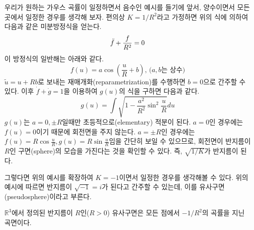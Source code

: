 \documentclass[10pt,a4paper]{article}
\begin{document}
우리가 원하는 가우스 곡률이 일정하면서 음수인 예시를 들기에 앞서, 양수이면서 모든 곳에서 일정한 경우를 생각해 보자. 편의상 $K = 1/R^{2}$라고 가정하면 위의 식에 의하여 다음과 같은 미분방정식을 얻는다.
\[\Ddot{f}+\frac{f}{R^2}=0\]
이 방정식의 일반해는 아래와 같다.
\[f(u) = a \cos \left( \frac{u}{R} + b \right)\text{, (}a, b\text{는 상수)}\]
$\tilde{u}=u+Rb$로 보내는 재매개화(reparametrization)를 수행하면 $b = 0$으로 간주할 수 있다. 이후 $\dot{f} + \dot{g} = 1$을 이용하여 $g(u)$의 식을 구하면 다음과 같다.
\[g(u) = \int \sqrt{1-\frac{a^2}{R^2}\sin^2 \frac{u}{R}} du\]
$g(u)$는 $a = 0, \pm R$일때만 초등적으로(elementary) 적분이 된다. $a = 0$인 경우에는 $f(u) = 0$이기 때문에 회전면을 주지 않는다. $a = \pm R$인 경우에는 $f(u) = R\cos \frac{u}{R} , g(u) = R \sin \frac{u}{R}$임을 간단히 보일 수 있으므로, 회전면이 반지름이 $R$인 구면(sphere)의 모습을 가진다는 것을 확인할 수 있다. 즉, $\sqrt{1/K}$가 반지름이 된다.

그렇다면 위의 예시를 확장하여 $K = -1$이면서 일정한 경우를 생각해볼 수 있다. 위의 예시에 따르면 반지름이 $\sqrt{-1} = i$가 된다고 간주할 수 있는데, 이를 유사구면(pseudosphere)이라고 부른다.
\begin{tcolorbox}[title = 유사구면(ppseudosphere)]
$\mathbb{R}^{3}$에서 정의된 반지름이 $R$인($R > 0$) 유사구면은 모든 점에서 $-1/R^{2}$의 곡률을 지닌 곡면이다.
\end{tcolorbox}
\end{document}
